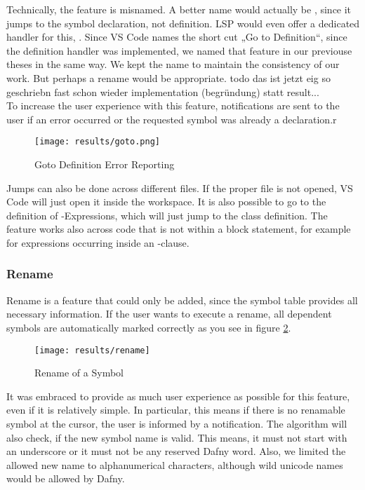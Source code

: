 Technically, the feature is misnamed.
A better name would actually be , since it jumps to the symbol declaration, not definition.
LSP would even offer a dedicated handler for this,  \cite{lspspec}.
Since VS Code names the short cut „Go to Definition“, since the definition handler was implemented, we named that feature in our previouse theses in the same way.
We kept the name to maintain the consistency of our work.
But perhaps a rename would be appropriate. todo das ist jetzt eig so geschriebn fast schon wieder implementation (begründung) statt result... \\

To increase the user experience with this feature, notifications are sent to the user if an error occurred or the requested symbol was already a declaration.r
\begin{figure}[h]
    \centering
    \texttt{[image: results/goto.png]}
    \caption{Goto Definition Error Reporting}
    \label{fig:goto}
\end{figure}


Jumps can also be done across different files.
If the proper file is not opened, VS Code will just open it inside the workspace.
It is also possible to go to the definition of -Expressions, which will just jump to the class definition.
The feature works also across code that is not within a block statement, for example for expressions occurring inside an -clause.

\subsubsection{Rename}
Rename is a feature that could only be added, since the symbol table provides all necessary information.
If the user wants to execute a rename, all dependent symbols are automatically marked correctly as you see in figure \ref{fig:rename}.

\begin{figure}[H]
    \centering
    \texttt{[image: results/rename]}
    \caption{Rename of a Symbol}
    \label{fig:rename}
\end{figure}

It was embraced to provide as much user experience as possible for this feature, even if it is relatively simple.
In particular, this means if there is no renamable symbol at the cursor, the user is informed by a notification.
The algorithm will also check, if the new symbol name is valid.
This means, it must not start with an underscore or it must not be any reserved Dafny word.
Also, we limited the allowed new name to alphanumerical characters, although wild unicode names would be allowed by Dafny.\\

